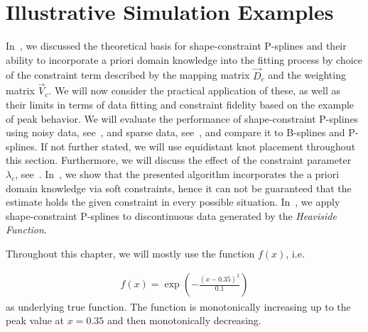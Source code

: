 \chapter{Illustrative Simulation Examples} \label{cha:practical-considerations}

In~, we discussed the theoretical basis for shape-constraint P-splines and their ability to incorporate a priori domain knowledge into the fitting process by choice of the constraint term described by the mapping matrix $\vec{D}_c$ and the weighting matrix $\vec{V}_c$. We will now consider the practical application of these, as well as their limits in terms of data fitting and constraint fidelity  based on the example of peak behavior. We will evaluate the performance of shape-constraint P-splines using noisy data, see~, and sparse data, see~, and compare it to B-splines and P-splines. If not further stated, we will use equidistant knot placement throughout this section. Furthermore, we will discuss the effect of the constraint parameter $\lambda_c$, see~. In~, we show that the presented algorithm incorporates the a priori domain knowledge via soft constraints, hence it can not be guaranteed that the estimate holds the given constraint in every possible situation. In~, we apply shape-constraint P-splines to discontinuous data generated by the \emph{Heaviside Function}.

Throughout this chapter, we will mostly use the function $f(x)$, i.e.

\begin{align} \label{eq:true-func-peak}
	f(x) = \exp\left(-\frac{(x - 0.35)^2}{0.1} \right)
\end{align}
% 
as underlying true function. The function is monotonically increasing up to the peak value at $x = 0.35$ and then monotonically decreasing.  

